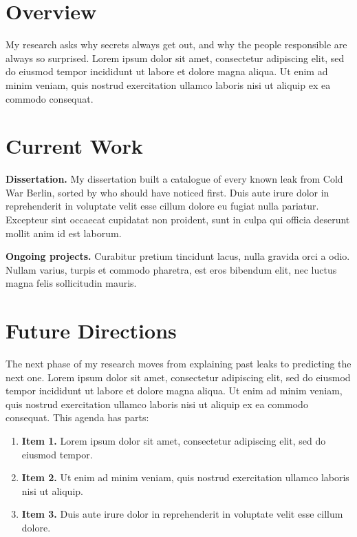 \documentclass[11pt]{article}
\begin{document}
\makeletterhead
{}
\preparedfor


\section{Overview}
My research asks why secrets always get out, and why the people responsible are always so surprised. Lorem ipsum dolor sit amet, consectetur adipiscing elit, sed do eiusmod tempor incididunt ut labore et dolore magna aliqua. Ut enim ad minim veniam, quis nostrud exercitation ullamco laboris nisi ut aliquip ex ea commodo consequat.

\section{Current Work}
\textbf{Dissertation.} My dissertation built a catalogue of every known leak from Cold War Berlin, sorted by who should have noticed first. Duis aute irure dolor in reprehenderit in voluptate velit esse cillum dolore eu fugiat nulla pariatur. Excepteur sint occaecat cupidatat non proident, sunt in culpa qui officia deserunt mollit anim id est laborum.

\textbf{Ongoing projects.} Curabitur pretium tincidunt lacus, nulla gravida orci a odio. Nullam varius, turpis et commodo pharetra, est eros bibendum elit, nec luctus magna felis sollicitudin mauris.

\section{Future Directions}
The next phase of my research moves from explaining past leaks to predicting the next one. Lorem ipsum dolor sit amet, consectetur adipiscing elit, sed do eiusmod tempor incididunt ut labore et dolore magna aliqua. Ut enim ad minim veniam, quis nostrud exercitation ullamco laboris nisi ut aliquip ex ea commodo consequat. This agenda has  parts:
\begin{enumerate}
  \item \textbf{Item 1.} Lorem ipsum dolor sit amet, consectetur adipiscing elit, sed do eiusmod tempor.
  \item \textbf{Item 2.} Ut enim ad minim veniam, quis nostrud exercitation ullamco laboris nisi ut aliquip.
  \item \textbf{Item 3.} Duis aute irure dolor in reprehenderit in voluptate velit esse cillum dolore.
  \ifempty{\individualizedresearchexpansion}{}{\item \draftcolor{\individualizedresearchexpansion}}
\end{enumerate}
\end{document}
